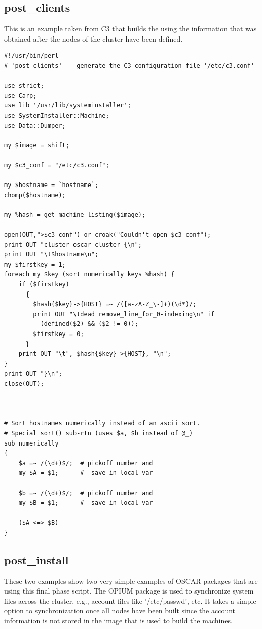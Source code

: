 \subsection{post\_clients}

This is an example taken from C3 that builds the  using
the information that was obtained after the nodes of the cluster have been
defined. 
\begin{scriptsize}
\begin{verbatim}
#!/usr/bin/perl
# 'post_clients' -- generate the C3 configuration file '/etc/c3.conf'

use strict;
use Carp;
use lib '/usr/lib/systeminstaller';
use SystemInstaller::Machine;
use Data::Dumper;

my $image = shift;

my $c3_conf = "/etc/c3.conf";

my $hostname = `hostname`;
chomp($hostname);

my %hash = get_machine_listing($image);

open(OUT,">$c3_conf") or croak("Couldn't open $c3_conf");
print OUT "cluster oscar_cluster {\n";
print OUT "\t$hostname\n";
my $firstkey = 1;
foreach my $key (sort numerically keys %hash) {
    if ($firstkey)
      {
        $hash{$key}->{HOST} =~ /([a-zA-Z_\-]+)(\d*)/;
        print OUT "\tdead remove_line_for_0-indexing\n" if 
          (defined($2) && ($2 != 0));
        $firstkey = 0;
      }
    print OUT "\t", $hash{$key}->{HOST}, "\n";
}
print OUT "}\n";
close(OUT);



# Sort hostnames numerically instead of an ascii sort.
# Special sort() sub-rtn (uses $a, $b instead of @_)
sub numerically
{
    $a =~ /(\d+)$/;  # pickoff number and
    my $A = $1;      #  save in local var

    $b =~ /(\d+)$/;  # pickoff number and
    my $B = $1;      #  save in local var

    ($A <=> $B)
}
\end{verbatim}
\end{scriptsize}


\subsection{post\_install}

These two examples show two very simple examples of OSCAR packages that are
using this final phase script.  The OPIUM package is used to synchronize
system files across the cluster, e.g., account files like '/etc/passwd',
etc.  It takes a simple option to  synchronization once all
nodes have been built since the account information is not stored in the
image that is used to build the machines.

